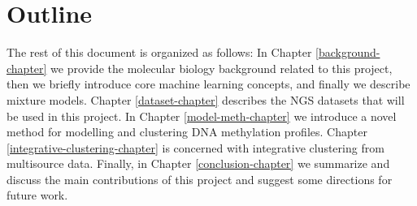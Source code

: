 \section{Outline} \label{outline-intro-l}
The rest of this document is organized as follows: In Chapter \ref{background-chapter} we provide the molecular biology background related to this project, then we briefly introduce core machine learning concepts, and finally we describe mixture models. Chapter \ref{dataset-chapter} describes the NGS datasets that will be used in this project. In Chapter \ref{model-meth-chapter} we introduce a novel method for modelling and clustering DNA methylation profiles. Chapter \ref{integrative-clustering-chapter} is concerned with integrative clustering from multisource data. Finally, in Chapter \ref{conclusion-chapter} we summarize and discuss the main contributions of this project and suggest some directions for future work.